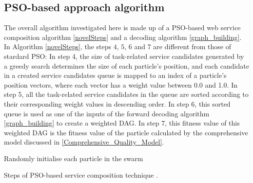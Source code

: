 \documentclass{llncs}
\begin{document}
\subsection{PSO-based approach algorithm}\label{POS-based_algomargin}
The overall algorithm investigated here is made up of a PSO-based web service composition algorithm \ref{novelSteps} and a decoding algorithm \ref{graph_building}. In Algorithm \ref{novelSteps}, the  steps $4$, $5$, $6$ and $7$ are different from those of stardard PSO: In step 4, the size of task-related service candidates generated by a greedy search determines the size of each particle's position, and each candidate in a created service candidates queue is mapped to an index of a particle’s position vectors, where each vector has a weight value between 0.0 and 1.0. In step 5, all the task-related service candidates in the queue are sorted according to their corresponding weight values in descending order. In step 6, this sorted queue is used as one of the inputs of the forward decoding algorithm \ref{graph_building} to create a weighted DAG. In step 7, this fitness value of this weighted DAG is the fitness value of the particle calculated by the comprehensive model discussed in \ref{Comprehensive_Quality_Model}.
\begin{algorithm}
 \SetNlSty{}{}{:}
 Randomly initialise each particle in the swarm\;
\caption{Steps of PSO-based service composition technique \cite{da2016particle}.}
\label{novelSteps}
\end{algorithm} 
\end{document}
